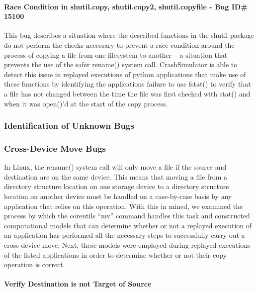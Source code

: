             \paragraph{Race Condition in shutil.copy, shutil.copy2, shutil.copyfile - Bug ID\# 15100}
              
            This bug describes a situation where the described functions in the shutil package do not perform the checks
            necessary to prevent a race condition around the process of copying a file from one filesystem to another --
            a situation that prevents the use of the safer rename() system call.  CrashSimulator is able to detect this
            issue in replayed executions of python applications that make use of these functions by identifying the
            applications failure to use fstat() to verify that a file has not changed between the time the file was
            first checked with stat() and when it was open()'d at the start of the copy process.

        \subsubsection{Identification of Unknown Bugs}

        \subsubsection{Cross-Device Move Bugs}

        In Linux, the rename() system call will only move a file if the source and destination are on the same device.
        This means that moving a file from a directory structure location on one storage device to a directory structure location on
        another device must be handled on a case-by-case basis by any application that relies on this operation.  With
        this in mined, we examined the process by which the coreutils ``mv'' command handles this task and constructed
        computational models that can determine whether or not a replayed execution of an application has performed all
        the necessary steps to successfully carry out a cross device move.  Next, these models were employed during
        replayed executions of the listed applications in order to determine whether or not their copy operation is correct.

        \paragraph{Verify Destination is not Target of Source}

